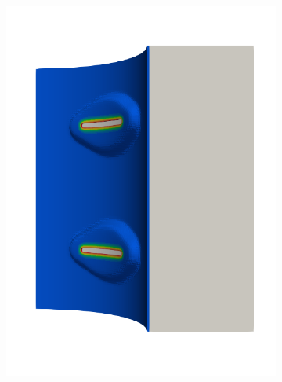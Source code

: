\begin{frame}
\begin{columns}[T]
\begin{column}{0.6\textwidth}
\begin{figure}
{\begin{subfigure}{0.19\textwidth}
            \includegraphics[width=\textwidth]{Chapter345/figures/seed_d_4}
          \end{subfigure}
          \hspace{0.06\textwidth}
          \begin{subfigure}{0.19\textwidth}
            \centering

\end{subfigure}}
\end{figure}
\end{column}
\end{columns}
\end{frame}
